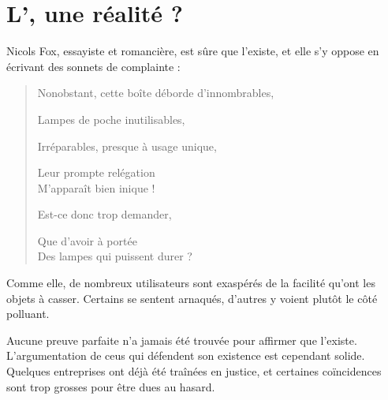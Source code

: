 \section{L'\op, une réalité ?}

Nicols Fox, essayiste et romancière, est sûre que l'\op existe, et elle s'y oppose en écrivant des sonnets de complainte : 
\itshape\begin{center}
\begin{verse}
Nonobstant, cette boîte déborde d'innombrables,

Lampes de poche inutilisables,

Irréparables, presque à usage unique,

Leur prompte relégation\\
M’apparaît bien inique !

Est-ce donc trop demander,

Que d'avoir à portée\\
Des lampes qui puissent durer ?
\end{verse}
\end{center}
\normalfont
Comme elle, de nombreux utilisateurs sont exaspérés de la facilité qu'ont les objets à casser. Certains se sentent arnaqués, d'autres y voient plutôt le côté polluant. 

\bigbreak

Aucune preuve parfaite n'a jamais été trouvée pour affirmer que l'\op existe. L'argumentation de ceus qui défendent son existence est cependant solide. Quelques entreprises ont déjà été traînées en justice, et certaines coïncidences sont trop grosses pour être dues au hasard.